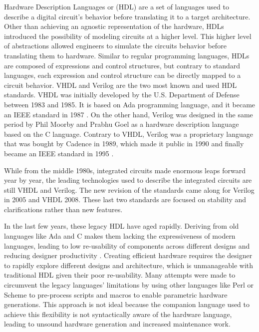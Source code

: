 Hardware Description Languages or (HDL) are a set of languages used to describe
a digital circuit's behavior before translating it to a target architecture.
Other than achieving an agnostic representation of the hardware, HDLs introduced
the possibility of modeling circuits at a higher level. This higher level of
abstractions allowed engineers to simulate the circuits behavior before
translating them to hardware. Similar to regular programming languages, HDLs are
composed of expressions and control structures, but contrary to standard
languages, each expression and control structure can be directly mapped to a
circuit behavior. VHDL and Verilog are the two most known and used HDL
standards. VHDL was initially developed by the U.S. Department of Defense
between 1983 and 1985. It is based on Ada programming language, and it became an
IEEE standard in 1987 \cite{coelho2012vhdl}. On the other hand, Verilog was
designed in the same period by Phil Moorby and Prabhu Goel as a hardware
description language based on the C language. Contrary to VHDL, Verilog was a
proprietary language that was bought by Cadence in 1989, which made it public in
1990 and finally became an IEEE standard in 1995 \cite{tala2003verilog}.

While from the middle 1980s, integrated circuits made enormous leaps forward
year by year, the leading technologies used to describe the integrated circuits
are still VHDL and Verilog. The new revision of the standards came along for
Verilog in 2005 and VHDL 2008. These last two standards are focused on stability
and clarifications rather than new features.

In the last few years, these legacy HDL have aged rapidly. Deriving from old
languages like Ada and C makes them lacking the expressiveness of modern
languages, leading to low re-usability of components across different designs
and reducing designer productivity \cite{bachrach2012chisel}. Creating efficient
hardware requires the designer to rapidly explore different designs and
architecture, which is unmanageable with traditional HDL given their poor
re-usability. Many attempts were made to circumvent the legacy languages'
limitations by using other languages like Perl \cite{shacham2012avoiding} or
Scheme \cite{jennings1999verischemelog} to pre-process scripts and macros to
enable parametric hardware generations. This approach is not ideal because the
companion language used to achieve this flexibility is not syntactically aware
of the hardware language, leading to unsound hardware generation and increased
maintenance work.


